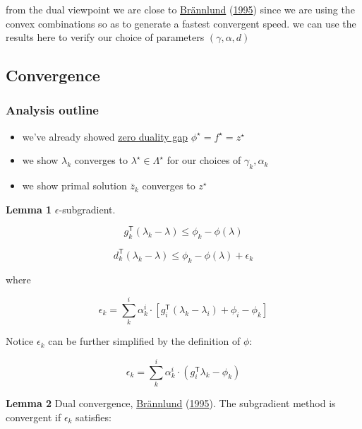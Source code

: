 \documentclass[
  a4paper,
,tablecaptionabove
]{scrartcl}
\numberwithin{equation}{section}
\providecommand{\tightlist}{%
  \setlength{\itemsep}{0pt}\setlength{\parskip}{0pt}}
\begin{document}
from the dual viewpoint we are close to
\protect\hyperlink{ref-brannlund1995generalized}{Brännlund}
(\protect\hyperlink{ref-brannlund1995generalized}{1995}) since we are
using the convex combinations so as to generate a fastest convergent
speed. we can use the results here to verify our choice of parameters
\((\gamma, \alpha, d)\)

\hypertarget{sec:convergence}{%
  \subsection{Convergence}\label{convergence}}

\hypertarget{sec:analysis-outline}{%
  \subsubsection{Analysis outline}\label{analysis-outline}}

\begin{itemize}
  \tightlist
  \item
        we've already showed
        \protect\hyperlink{conditions-for-strong-duality}{zero duality gap}
        \(\phi^\star = f^\star= z^\star\)
  \item
        we show \(\lambda_k\) converges to \(\lambda^\star \in \Lambda^\star\)
        for our choices of \(\gamma_k, \alpha_k\)
  \item
        we show primal solution \(\bar z_k\) converges to \(z^\star\)
\end{itemize}

\textbf{Lemma 1} \(\epsilon\)-subgradient.

\[g_{k}^\mathsf{T}(\lambda_{k}  -\lambda) \le \phi_{k} - \phi(\lambda)\]

\[d_{k}^\mathsf{T}(\lambda_{k}  -\lambda) \le \phi_{k} - \phi(\lambda) + \epsilon_k\]

where

\[\epsilon_k = \sum^i_k \alpha^i_k \cdot \left [g_i^\mathsf{T}(\lambda_k - \lambda_i) + \phi_i - \phi_k \right ]\]

Notice \(\epsilon_k\) can be further simplified by the definition of
\(\phi\):

\[\epsilon_k = \sum^i_k \alpha^i_k \cdot \left ( g_i^\mathsf{T}\lambda_k  - \phi_k \right )\]

\textbf{Lemma 2} Dual convergence,
\protect\hyperlink{ref-brannlund1995generalized}{Brännlund}
(\protect\hyperlink{ref-brannlund1995generalized}{1995}). The
subgradient method is convergent if \(\epsilon_k\) satisfies:
\end{document}
